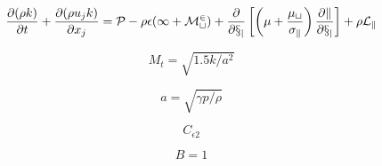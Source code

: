 

\begin{equation}
\frac{\partial (\rho k)}{\partial t} + \frac{\partial (\rho u_j k)}{\partial x_j}
  = \cal P - \rho \epsilon (1 + M_t^2)  + \frac{\partial}{\partial x_j}
  \left[\left(\mu + \frac{\mu_t}{\sigma_k} \right)\frac{\partial k}{\partial x_j}\right]
  + \rho L_k
\end{equation}

\begin{equation}
M_t = \sqrt{1.5 k / a^2}
\end{equation}

\begin{equation}
a = \sqrt{\gamma p / \rho}
\end{equation}

\begin{equation}
C_{\epsilon 2}
\end{equation}

\begin{equation}
B=1
\end{equation}


